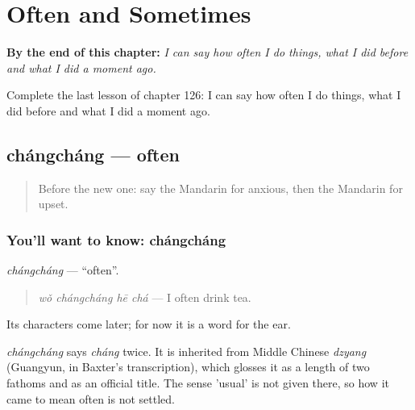 
\chapter{Often and Sometimes}
\label{ch:zh-often-and-sometimes}

\begin{chapteropening}
\textbf{By the end of this chapter:} \emph{I can say how often I do things, what I did before and what I did a moment ago.}

Complete the last lesson of chapter 126: I can say how often I do things, what I did before and what I did a moment ago.
\end{chapteropening}

\section[chángcháng]{chángcháng — often}

\label{lesson:ZH-C126-changchang}



\begin{quote}
Before the new one: say the Mandarin for anxious, then the Mandarin for upset.
\end{quote}

\subsection*{You'll want to know: chángcháng}
\emph{chángcháng} — \textquotedblleft{}often\textquotedblright{}.

\begin{quote}
\emph{wǒ chángcháng hē chá} — I often drink tea.
\end{quote}

Its characters come later; for now it is a word for the ear.

\begin{cousinweb}
\emph{chángcháng} says \emph{cháng} twice. It is inherited from Middle Chinese \emph{dzyang} (Guangyun, in Baxter's transcription), which glosses it as a length of two fathoms and as an official title. The sense 'usual' is not given there, so how it came to mean often is not settled.
\end{cousinweb}

